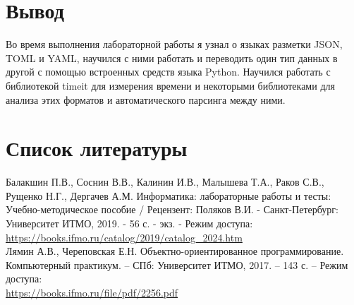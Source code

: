 \section{Вывод}
Во время выполнения лабораторной работы я узнал о языках разметки JSON, TOML и YAML, научился с ними работать и переводить один тип данных в другой с помощью встроенных средств языка Python. Научился работать с библиотекой timeit для измерения времени и некоторыми библиотеками для анализа этих форматов и автоматического парсинга между ними. 
\section{Список литературы}
Балакшин П.В., Соснин В.В., Калинин И.В., Малышева Т.А., Раков С.В., Рущенко Н.Г., Дергачев А.М.
Информатика: лабораторные работы и тесты: Учебно-методическое пособие / Рецензент: Поляков
В.И. - Санкт-Петербург: Университет ИТМО, 2019. - 56 с. - экз. - Режим доступа: \\
\href{https://books.ifmo.ru/catalog/2019/catalog\_2024.htm}{https://books.ifmo.ru/catalog/2019/catalog\_2024.htm} \\

\noindent Лямин А.В., Череповская Е.Н. Объектно-ориентированное программирование. Компьютерный практикум. – СПб: Университет ИТМО, 2017. – 143 с. – Режим доступа: \\ \href{https://books.ifmo.ru/file/pdf/2256.pdf}{https://books.ifmo.ru/file/pdf/2256.pdf}
